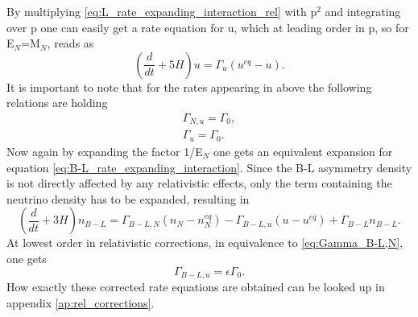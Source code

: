 By multiplying \eqref{eq:L_rate_expanding_interaction_rel} with p$^2$ and integrating over p one can easily get a rate equation for u, which at leading order in p, so for E$_N$=M$_N$, reads as
\begin{equation}
	\left(\frac{d}{dt}+5H\right)u=\Gamma_u\left(u^{eq}-u\right).
	\label{eq:rate_u}
\end{equation}
It is important to note that for the rates appearing in above the following relations are holding
\begin{align}
	\Gamma_{N,u}=\Gamma_{0},
	\label{eq:Gamma_N,u}
	\\
	\Gamma_{u}=\Gamma_{0}.
	\label{eq:Gamma_u}
\end{align}
Now again by expanding the factor 1/E$_N$ one gets an equivalent expansion for equation \eqref{eq:B-L_rate_expanding_interaction}. Since the B-L asymmetry density is not directly affected by any relativistic effects, only the term containing the neutrino density has to be expanded, resulting in
\begin{equation}
	\left(\frac{d}{dt}+3H\right)n_{B-L}=\Gamma_{B-L,N}\left(n_N-n_N^{eq}\right)-\Gamma_{B-L,u}\left(u-u^{eq}\right)+\Gamma_{B-L}n_{B-L}.
	\label{eq:B-L_rate_expanding_interaction_rel}
\end{equation}
At lowest order in relativistic corrections, in equivalence to \eqref{eq:Gamma_B-L,N}, one gets
\begin{equation}
	\Gamma_{B-L,u}=\epsilon\Gamma_0.
	\label{eq:Gamma_B-L,u}
\end{equation}
How exactly these corrected rate equations are obtained can be looked up in appendix \ref{ap:rel_corrections}.
